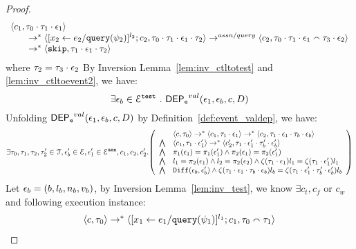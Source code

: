 \begin{proof}
\begin{equation}
\begin{array}{l}
 \langle c_1, \mathtt{\tau}_0 \cdot \mathtt{\tau}_1 \cdot \mathtt{\epsilon}_1 \rangle 
 \\ \qquad 
 \rightarrow^{*} 
  \langle [\mathrel{ {x}_2 \leftarrow e_2 / {\tt query}(\psi_2) }]^{l_2};{c}_2, 
  \mathtt{\tau}_0 \cdot \mathtt{\tau}_1 \cdot \mathtt{\epsilon}_1 \cdot \mathtt{\tau}_2 \rangle 
  \rightarrow^{assn/query} 
  \langle {c}_2,  \mathtt{\tau}_0 \cdot \mathtt{\tau}_1 \cdot \mathtt{\epsilon}_1 \smallfrown \mathtt{\tau}_3 \cdot \mathtt{\epsilon}_2 \rangle 
  \\ \qquad 
  \rightarrow^*
  \langle \mathtt{skip},  \mathtt{\tau}_1 \cdot \mathtt{\epsilon}_1 \cdot \mathtt{\tau}_2 \rangle
\end{array}
\end{equation}
%
where $\mathtt{\tau}_2 = \mathtt{\tau}_3 \cdot \mathtt{\epsilon}_2 $
%
 By {Inversion Lemma~\ref{lem:inv_ctltotest} and \ref{lem:inv_ctltoevent2}}, we have:
 \[
   \exists \mathtt{\epsilon}_b \in \mathcal{E}^{\mathtt{{test}}} ~.~ \mathsf{DEP_{\mathtt{e}}}^{val}(\mathtt{\epsilon}_1, \mathtt{\epsilon}_b, c, D)
 \]
 Unfolding $\mathsf{DEP_{\mathtt{e}}}^{val}(\mathtt{\epsilon}_1, \mathtt{\epsilon}_b, c, D)$ by Definition~\ref{def:event_valdep}, we have:
\[
\exists \vtrace_0,
\vtrace_1, \vtrace_2, \vtrace_2' \in \mathcal{T}, \event_b' \in \eventset, \event_1' \in \eventset^{\asn}, 
{c}_1, {c}_2,  {c}_2'.
  \left(
  \begin{array}{ll}   
 & \config{{c}, \vtrace_0} \rightarrow^{*} 
\config{{c}_1, \vtrace_1 \cdot \event_1}  \rightarrow^{*} 
  \config{{c}_2,  \vtrace_1 \cdot \event_1 \cdot \vtrace_b \cdot \event_b } 
 \\ 
 \bigwedge &
  \config{{c}_1, \vtrace_1 \cdot \event_1'}  \rightarrow^{*} 
  \config{{c}_2',  \vtrace_1 \cdot \event_1' \cdot \vtrace_b' \cdot \event_b' } 
\\
\bigwedge &  \pi_1(\event_1) = \pi_1(\event_1') \land \pi_2(\event_1) = \pi_2(\event_1') \\
\bigwedge & l_1 = \pi_2(\event_1) \land l_2 = \pi_2(\event_2)
\land \vcounter(\vtrace_1 \cdot \event_1) l_1 = \vcounter(\vtrace_1 \cdot \event_1')l_1 
\\
\bigwedge & 
\diff(\event_b,\event_b' ) \land 
\vcounter(\vtrace_1 \cdot \event_1 \cdot \vtrace_b \cdot \event_b) l_b
= 
\vcounter(\vtrace_1 \cdot \event_1' \cdot \vtrace_b'\cdot \event_b') l_b\\
\end{array}
\right)
 \]
%
 Let $\mathtt{\epsilon}_b = (b, l_b, n_b, v_b)$, by {Inversion Lemma~\ref{lem:inv_test}},
we know $\exists  c_t, c_f$ or $c_w$ and following execution instance:
\begin{equation}
\label{eq:ctldep_inv1}
  \begin{array}{l}   
\langle {c}, \mathtt{\tau}_0 \rangle \rightarrow^{*} 
\langle [\mathrel{ {x}_1 \leftarrow e_1 / {\tt query}(\psi_1) }]^{l_1} ; {c}_1, \mathtt{\tau}_0 \smallfrown \mathtt{\tau}_1 \rangle  

\end{array}
\end{equation}
\end{proof}
